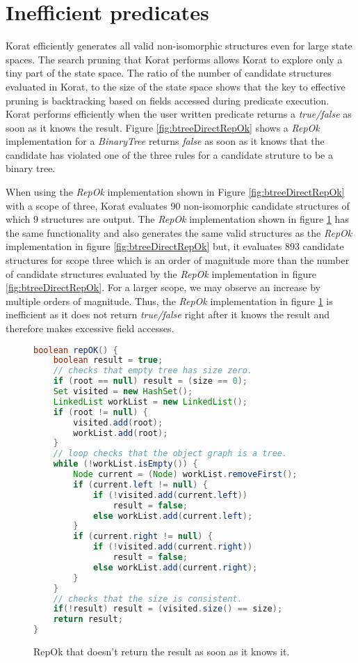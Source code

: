 \section{Inefficient predicates}
\label{sec:inefficient-predicates}
Korat efficiently generates all valid non-isomorphic structures even
for large state spaces. The search pruning that Korat performs allows
Korat to explore only a tiny part of the state space. The ratio of the
number of candidate structures evaluated in Korat, to the size of the
state space shows that the key to effective pruning is backtracking
based on fields accessed during predicate execution. Korat performs
efficiently when the user written predicate returns a
\emph{true/false} as soon as it knows the result. Figure
\ref{fig:btreeDirectRepOk} shows a \emph{RepOk} implementation for a
\emph{BinaryTree} returns \emph{false} as soon as it knows that the
candidate has violated one of the three rules for a candidate struture
to be a binary tree.

\para When using the \emph{RepOk} implementation shown in Figure
\ref{fig:btreeDirectRepOk} with a scope of three, Korat evaluates 90
non-isomorphic candidate structures of which 9 structures are
output. The \emph{RepOk} implementation shown in figure
\ref{fig:bTreeInefficient} has the same functionality and also
generates the same valid structures as the \emph{RepOk} implementation
in figure \ref{fig:btreeDirectRepOk} but, it evaluates 893 candidate
structures for scope three which is an order of magnitude more than
the number of candidate structures evaluated by the \emph{RepOk}
implementation in figure \ref{fig:btreeDirectRepOk}. For a larger
scope, we may observe an increase by multiple orders of magnitude. Thus, the
\emph{RepOk} implementation in figure \ref{fig:bTreeInefficient} is
inefficient as it does not return \emph{true/false} right after it
knows the result and therefore makes excessive field accesses.

\begin{figure}
\centering
\begin{lstlisting}[language=Java]
boolean repOK() {
    boolean result = true;
    // checks that empty tree has size zero.
    if (root == null) result = (size == 0);
    Set visited = new HashSet();
    LinkedList workList = new LinkedList();
    if (root != null) {
        visited.add(root);
        workList.add(root);
    }
    // loop checks that the object graph is a tree.
    while (!workList.isEmpty()) {
        Node current = (Node) workList.removeFirst();
        if (current.left != null) {
            if (!visited.add(current.left))
                result = false;
            else workList.add(current.left);
        }
        if (current.right != null) {
            if (!visited.add(current.right)) 
                result = false;
            else workList.add(current.right);
        }
    }
    // checks that the size is consistent.
    if(!result) result = (visited.size() == size);
    return result;
}
\end{lstlisting}
\caption{RepOk that doesn’t return the result as soon as it knows it.}
\label{fig:bTreeInefficient}
\end{figure}
